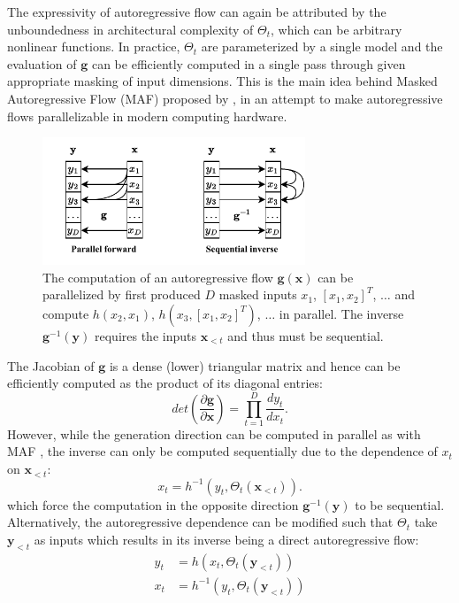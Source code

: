 The expressivity of autoregressive flow can again be attributed by the
unboundedness in architectural complexity of $\Theta_t$, which can be arbitrary
nonlinear functions. In practice, $\Theta_t$ are parameterized by a single model
and the evaluation of $\mathbf{g}$ can be efficiently computed in a single pass
through given appropriate masking of input dimensions. This is the main idea
behind Masked Autoregressive Flow (MAF) proposed by
\citep{papamakariosMaskedAutoregressiveFlow2017}, in an attempt to make
autoregressive flows parallelizable in modern computing hardware.
\begin{figure}
  \begin{center}
    \includegraphics[width=0.7\textwidth]{figures/autoregressiveflow.pdf}
  \end{center}
  \caption{The computation of an autoregressive flow $\mathbf{g}(\mathbf{x})$
  can be parallelized by first
  produced $D$ masked inputs $x_1$, $[x_1, x_2]^T$, $\ldots$
  and compute $h(x_2, x_1)$, $h(x_3, [x_1, x_2]^T)$, $\ldots$ in parallel.
  The inverse $\mathbf{g}^{-1}(\mathbf{y})$ requires the inputs
  $\mathbf{x}_{<t}$ and thus must be sequential.}
  \label{fig:autoregressiveflow}
\end{figure}

The Jacobian of $\textbf{g}$ is a dense (lower) triangular matrix and hence
can be efficiently computed as the product of its diagonal entries:
$$
det \left(
\frac{\partial \mathbf{g}}{\partial \mathbf{x} }
\right) =  \prod_{t=1}^D \frac{dy_t}{dx_t}
.$$
However, while the generation direction can be computed in parallel as with MAF
,  the inverse can only be computed sequentially due to the dependence of
$x_{t}$ on $\textbf{x}_{<t}$:
$$
x_{t} = h^{-1}(y_t,
\Theta_t(\textbf{x}_{<t}))
.$$
which force the computation in the opposite direction
$\mathbf{g}^{-1}(\mathbf{y})$ to be sequential. Alternatively, the autoregressive dependence can be modified such that
$\Theta_t$ take $\mathbf{y}_{<t}$ as inputs which results in its inverse being a direct autoregressive flow:
\begin{align*}
  y_t &= h(x_t, \Theta_t(\mathbf{y}_{<t}))\\
  x_{t} &= h^{-1}(y_t, \Theta_t(\textbf{y}_{<t}))
\end{align*}

